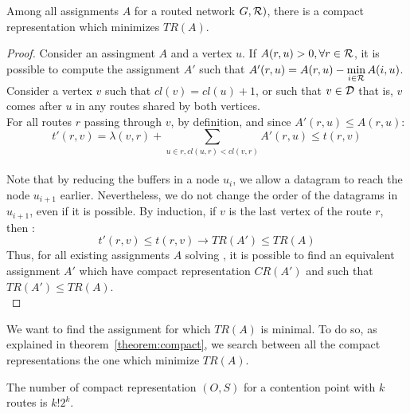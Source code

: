 \documentclass[english]{article}
\begin{document}
\begin{theorem}
Among all assignments $A$ for a routed network $G,{\cal R})$, there is a compact representation which minimizes $TR(A)$.
\label{theorem:compact}
\end{theorem}
\begin{proof}
Consider an assingment $A$ and a vertex $u$.
If $A(r,u) > 0, \forall r \in {\cal R}$, it is possible to compute the assignment $A'$ such that
$A'(r,u) = A(r,u)-\min\limits_{i \in {\cal R}} A(i,u)$. Consider a vertex $v$ such that $cl(v) = cl(u) +1$, or such that $v \in {\cal D}$ that is, $v$ comes after $u$ in any routes shared by both vertices.\\
For all routes $r$ passing through $v$, by definition, and since $A'(r,u) \leq A(r,u)$: $$t'(r,v) = \lambda(v,r) + \sum_{u \in r, cl(u,r) < cl(v,r)} A'(r,u)  \leq t(r,v)$$\\
Note that by reducing the buffers in a node $u_i$, we allow a datagram to reach the node $u_{i+1}$ earlier. Nevertheless, we do not change the order of the datagrams in $u_{i+1}$, even if it is possible.
By induction, if $v$ is the last vertex of the route $r$, then : $$t'(r,v) \leq t(r,v) \rightarrow TR(A') \leq TR(A)$$
Thus, for all existing assignments $A$ solving \spall, it is possible to find an equivalent assignment $A'$ which have compact representation $CR(A')$ and such that $TR(A') \leq TR(A)$.\\
\end{proof}


We want to find the assignment for which $TR(A)$ is minimal. To do so, as explained in theorem~\ref{theorem:compact}, we search between all the compact representations the one which minimize $TR(A)$.

\begin{lemma}
 The number of compact representation $(O,S)$ for a contention point with $k$ routes is $k!2^{k}$.
 \label{lemma:numberarcs}
\end{lemma}
\end{document}
